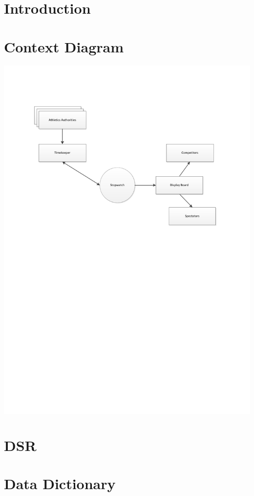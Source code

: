 \documentclass{report}
\begin{document}
\chapter{Introduction}


\chapter{Context Diagram}
\includegraphics[width=\textwidth]{RE_Diagrams.pdf}

\chapter{DSR}


\chapter{Data Dictionary}

\end{document}

